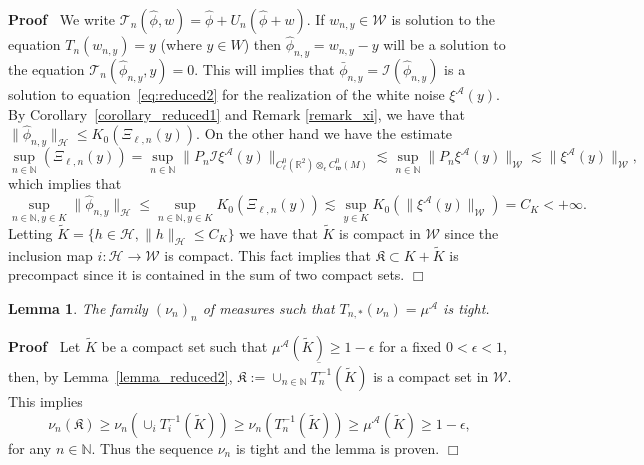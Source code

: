 \documentclass[a4paper,10pt]{article}
\newcommand{\assign}{:=}
\newcommand{\asterisk}{\mathord{*}}
\newcommand{\nobracket}{}
\newenvironment{proof}{\noindent\textbf{Proof\ }}{\hspace*{\fill}$\Box$\medskip}
\newtheorem{lemma}[theorem]{Lemma}
\begin{document}
\begin{proof}
  We write $\mathcal{T}_n (\hat{\phi}, w) = \hat{\phi} + U_n (\hat{\phi} + w)
  .$ If $w_{n, y} \in \mathcal{W}$ is solution to the equation $T_n  (w_{n,
  y}) = y$ (where $y \in W$) then $\hat{\phi}_{n, y} = w_{n, y} - y$ will be a
  solution to the equation $\mathcal{T}_n (\hat{\phi}_{n, y}, y) = 0$. This
  will implies that $\bar{\phi}_{n, y} = \mathcal{I} (\hat{\phi}_{n, y})$ is a
  solution to equation~{\eqref{eq:reduced2}} for the realization of the white
  noise $\xi^{\mathcal{A}} (y)$. By Corollary~\ref{corollary_reduced1} and
  Remark \ref{remark_xi}, we have that $\| \hat{\phi}_{n, y} \|_{\mathcal{H}}
  \leqslant K_0 (\Xi_{\ell, n} (y))$. On the other hand we have the estimate
  \[ \sup_{n \in \mathbb{N}} (\Xi_{\ell, n} (y)) = \sup_{n \in \mathbb{N}} \|
     P_n \mathcal{I} \xi^{\mathcal{A}} (y) \|_{\nobracket C^0_{\ell}
     (\mathbb{R}^2 \nobracket) \otimes_{\epsilon} C^0_{\mathfrak{w}} (M)}
     \lesssim \sup_{n \in \mathbb{N}} \| P_n \xi^{\mathcal{A}} (y)
     \|_{\mathcal{W}} \lesssim \| \xi^{\mathcal{A}} (y) \|_{\mathcal{W}}, \]
  which implies that
  \[ \sup_{n \in \mathbb{N}, y \in K} \| \hat{\phi}_{n, y} \|_{\mathcal{H}}
     \leqslant \sup_{n \in \mathbb{N}, y \in K} K_0 (\Xi_{\ell, n} (y))
     \lesssim \sup_{y \in K} K_0 (\| \xi^{\mathcal{A}} (y) \|_{\mathcal{W}}) =
     C_K < + \infty . \]
  Letting $\tilde{K} = \{ h \in \mathcal{H}, \| h \|_{\mathcal{H}} \leqslant
  C_K \}$ we have that $\tilde{K}$ is compact in $\mathcal{W}$ since the
  inclusion map $i : \mathcal{H} \rightarrow \mathcal{W}$ is compact. This
  fact implies that $\mathfrak{K} \subset K + \tilde{K}$ is precompact since
  it is contained in the sum of two compact sets.
\end{proof}

\begin{lemma}
  \label{lemma_reduced3}The family $(\nu_n)_n$ of measures such that $T_{n,
  \asterisk} (\nu_n) = \mu^{\mathcal{A}}$ is tight.
\end{lemma}

\begin{proof}
  Let $\tilde{K}$ be a compact set such that $\mu^{\mathcal{A}} (\tilde{K})
  \geqslant 1 - \epsilon$ for a fixed $0 < \epsilon < 1$, then, by
  Lemma~\ref{lemma_reduced2}, $\mathfrak{K} \assign \overline{\cup_{n \in
  \mathbb{N}} T^{- 1}_n (\tilde{K})}$ is a compact set in $\mathcal{W}$. This
  implies
  \[ \nu_n (\mathfrak{K}) \geqslant \nu_n (\cup_i T^{- 1}_i (\tilde{K}))
     \geqslant \nu_n (T^{- 1}_n (\tilde{K})) \geqslant \mu^{\mathcal{A}}
     (\tilde{K}) \geqslant 1 - \epsilon, \]
  for any $n \in \mathbb{N}$. Thus the sequence $\nu_n$ is tight and the lemma
  is proven. 
\end{proof}
\end{document}
